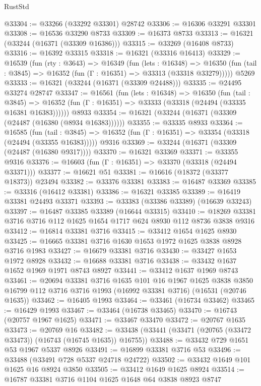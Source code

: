 \begin{lexlean}{RustStd}
\begin{coremodule}
@33304 := @33266 (@33292 @33301) @28742
@33306 := @16306 @33291 @33301
@33308 := @16536 @33290 @8733
@33309 := @16373 @8733
@33313 := @16321 (@33244 (@16371 (@33309 @16386)))
@33315 := @33269 (@16408 @8733)
@33316 := @16392 @33315
@33318 := @16321 (@33316 @16413)
@33329 := @16539
    (fun (rty : @3643) =>
    @16349
      (fun (lets : @16348) =>
      @16350 (fun (tail : @3845) => @16352 (fun (Γ : @16351) => @33313 (@33318 @33279)))))
    @5269
@33333 := @16321 (@33244 (@16371 (@33309 @24488)))
@33335 := @24495 @33274 @28747
@33347 := @16561
    (fun (lets : @16348) =>
    @16350
      (fun (tail : @3845) =>
      @16352 (fun (Γ : @16351) => @33333 (@33318 (@24494 (@33335 @16381 @16383))))))
    @8933
@33354 := @16321 (@33244 (@16371 (@33309 (@24487 (@16380 (@8934 @16383))))))
@33355 := @33335 @8933
@33364 := @16585
    (fun (tail : @3845) => @16352 (fun (Γ : @16351) => @33354 (@33318 (@24494 (@33355 @16383)))))
    @9316
@33369 := @33244 (@16371 (@33309 (@24487 (@16380 @9317))))
@33370 := @16321 @33369
@33371 := @33355 @9316
@33376 := @16603 (fun (Γ : @16351) => @33370 (@33318 (@24494 @33371)))
@33377 := @16621 @51
@33381 := @16616 (@18372 (@33377 @18373)) @23494
@33382 := @33376 @33381
@33383 := @16487 @33369
@33385 := @33316 (@16412 @33381)
@33386 := @16321 @33385
@33389 := @16419 @33381 @24493 @33371
@33393 := @33383 (@33386 @33389) (@16639 @33243)
@33397 := @16487 @33385 @33389 (@16644 @33315)
@33410 := @18269 @33381 @3716 @3716 @112 @1625 @1654 @1717 @624 @8930 @112 @8736 @3838 @9316
@33412 := @16814 @33381 @3716
@33415 := @33412 @1654 @1625 @8930
@33425 := @16665 @33381 @3716 @1630 @1653 @1972 @1625 @3838 @8928 @3716 @1983
@33427 := @16679 @33381 @3716
@33430 := @33427 @1653 @1972 @8928
@33432 := @16688 @33381 @3716
@33438 := @33432 @1637 @1652 @1969 @1971 @8743 @8927
@33441 := @33412 @1637 @1969 @8743
@33461 := @20694
    @33381
    @3716
    @1635
    @101
    @16
    @1967
    @1625
    @3838
    @3850
    @16799
    @112
    @3716
    @3716
    @1993
    (@16992 @33381 @3716)
    (@16531 (@20746 @1635))
@33462 := @16405 @1993
@33464 := @33461 (@16734 @33462)
@33465 := @16429 @1993
@33467 := @33464 (@16738 @33465)
@33470 := @16743 (@20757 @1967 @1625)
@33471 := @33467 @33470
@33472 := @20767 @1635
@33473 := @20769 @16
@33482 := @33438 (@33441 (@33471 (@20765 (@33472 @33473)) (@16743 (@16745 @1635)) @16755))
@33488 := @33432 @729 @1651 @53 @1967 @5337 @8926
@33491 := @16899 @33381 @3716 @53
@33496 := @33488 (@33491 @728 @5337 @24718 @24722)
@33502 := @33432 @1649 @101 @1625 @16 @8924 @3850
@33505 := @33412 @1649 @1625 @8924
@33514 := @16787 @33381 @3716 @1104 @1625 @1648 @64 @3838 @8923 @8747

\end{coremodule}
\end{lexlean}
